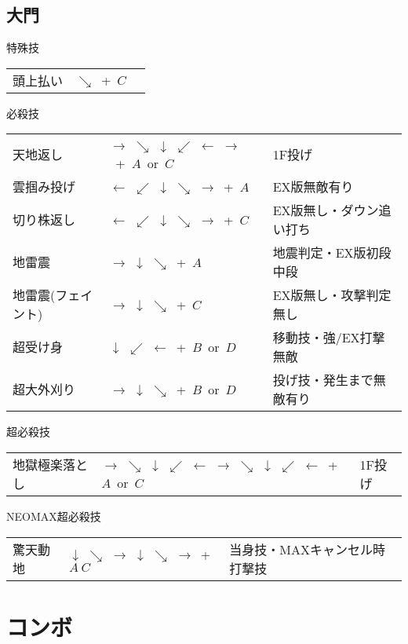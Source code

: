 \documentclass[a4j,11pt]{jarticle}
\begin{document}
\subsection{大門}
\begin{itembox}[l]{特殊技}
\begin{tabular}{lll}
頭上払い&$\searrow$\ +\ $C$&
\end{tabular}
\end{itembox}
\begin{itembox}[l]{必殺技}
\begin{tabular}{lll}
天地返し&$\rightarrow$ $\searrow$ $\downarrow$ $\swarrow$ $\leftarrow$ $\rightarrow$\ +\ $A$\ or\ $C$&1F投げ\\
雲掴み投げ&$\leftarrow$ $\swarrow$ $\downarrow$ $\searrow$ $\rightarrow$\ +\ $A$&EX版無敵有り\\
切り株返し&$\leftarrow$ $\swarrow$ $\downarrow$ $\searrow$ $\rightarrow$\ +\ $C$&EX版無し・ダウン追い打ち\\
地雷震&$\rightarrow$ $\downarrow$ $\searrow$\ +\ $A$&地震判定・EX版初段中段\\
地雷震(フェイント)&$\rightarrow$ $\downarrow$ $\searrow$\ +\ $C$&EX版無し・攻撃判定無し\\
超受け身&$\downarrow$ $\swarrow$ $\leftarrow$\ +\ $B$\ or\ $D$&移動技・強/EX打撃無敵\\
超大外刈り&$\rightarrow$ $\downarrow$ $\searrow$\ +\ $B$\ or\ $D$&投げ技・発生まで無敵有り
\end{tabular}
\end{itembox}
\begin{itembox}[l]{超必殺技}
\begin{tabular}{lll}
地獄極楽落とし&$\rightarrow$ $\searrow$ $\downarrow$ $\swarrow$ $\leftarrow$ $\rightarrow$ $\searrow$ $\downarrow$ $\swarrow$ $\leftarrow$\ +\ $A$\ or\ $C$&1F投げ
\end{tabular}
\end{itembox}
\begin{itembox}[l]{NEOMAX超必殺技}
\begin{tabular}{lll}
驚天動地&$\downarrow$ $\searrow$ $\rightarrow$ $\downarrow$ $\searrow$ $\rightarrow$\ +\ $A\ C$&当身技・MAXキャンセル時打撃技
\end{tabular}
\end{itembox}
\newpage
\section{コンボ}
\end{document}
